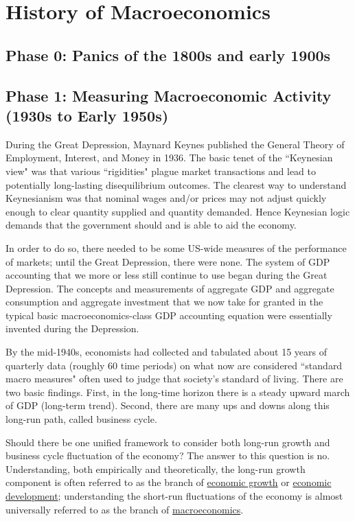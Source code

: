 \documentclass[10pt]{article}
\title{}
\author{}
\date{}
\begin{document}
\maketitle

\tableofcontents
\newpage

\section{History of Macroeconomics}
\subsection{Phase 0: Panics of the 1800s and early 1900s}
\subsection{Phase 1: Measuring Macroeconomic Activity (1930s to Early 1950s)}
During the Great Depression, Maynard Keynes  published the General Theory of Employment, Interest,
and Money in 1936.
The basic tenet of the ``Keynesian view" was that various ``rigidities" plague market transactions
and lead to potentially long-lasting disequilibrium outcomes. The clearest way to understand
Keynesianism was that nominal wages and/or prices may not adjust quickly enough to clear quantity
supplied and quantity demanded. Hence Keynesian logic demands that the government should and is able
to aid the economy.

In order to do so, there needed to be some US-wide measures of the performance of markets; until
the Great Depression, there were none. The system of GDP accounting that we more or less still
continue to use began during the Great Depression. The concepts and measurements of aggregate GDP
and aggregate consumption and aggregate investment that we now take for granted in the typical
basic macroeconomics-class GDP accounting equation were essentially invented during the Depression.

By the mid-1940s, economists had collected and tabulated about 15 years of quarterly data (roughly
60 time periods) on what now are considered ``standard macro measures" often used to judge that
society's standard of living. There are two basic findings. First, in the long-time horizon there
is a steady upward march of GDP (long-term trend). Second, there are many ups and downs along this 
long-run path, called business cycle.

Should there be one unified framework to consider both long-run growth and business cycle 
fluctuation of the economy? The answer to this question is no. Understanding, both empirically and
theoretically, the long-run growth component is often referred to as the branch of 
{\underline {economic growth}} or {\underline {economic development}}; understanding the short-run
fluctuations of the economy is almost universally referred to as the branch of 
{\underline {macroeconomics}}.
\end{document}
